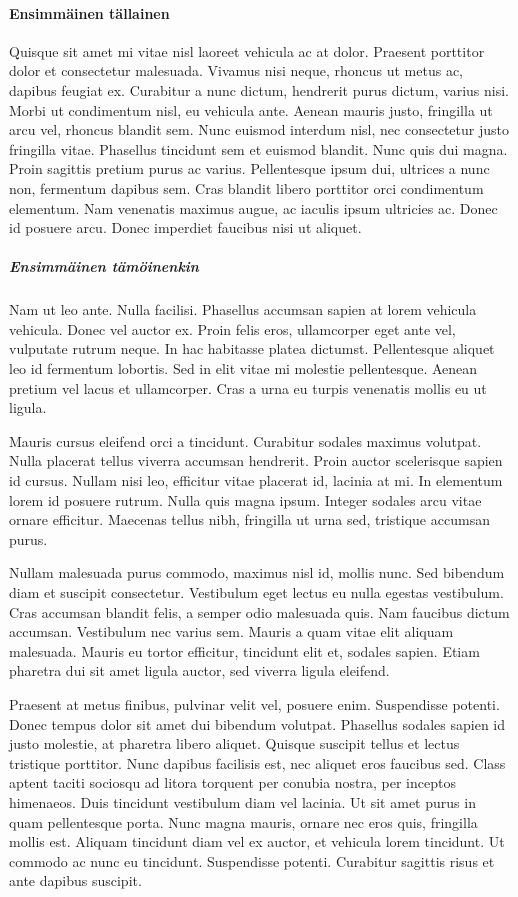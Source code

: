 \documentclass[12pt,a4paper,titlepage]{article}
\begin{document}
\paragraph{Ensimmäinen tällainen}
Quisque sit amet mi vitae nisl laoreet vehicula ac at dolor. Praesent porttitor dolor et consectetur malesuada. Vivamus nisi neque, rhoncus ut metus ac, dapibus feugiat ex. Curabitur a nunc dictum, hendrerit purus dictum, varius nisi. Morbi ut condimentum nisl, eu vehicula ante. Aenean mauris justo, fringilla ut arcu vel, rhoncus blandit sem. Nunc euismod interdum nisl, nec consectetur justo fringilla vitae. Phasellus tincidunt sem et euismod blandit. Nunc quis dui magna. Proin sagittis pretium purus ac varius. Pellentesque ipsum dui, ultrices a nunc non, fermentum dapibus sem. Cras blandit libero porttitor orci condimentum elementum. Nam venenatis maximus augue, ac iaculis ipsum ultricies ac. Donec id posuere arcu. Donec imperdiet faucibus nisi ut aliquet.

\subparagraph{Ensimmäinen tämöinenkin}
Nam ut leo ante. Nulla facilisi. Phasellus accumsan sapien at lorem vehicula vehicula. Donec vel auctor ex. Proin felis eros, ullamcorper eget ante vel, vulputate rutrum neque. In hac habitasse platea dictumst. Pellentesque aliquet leo id fermentum lobortis. Sed in elit vitae mi molestie pellentesque. Aenean pretium vel lacus et ullamcorper. Cras a urna eu turpis venenatis mollis eu ut ligula.

Mauris cursus eleifend orci a tincidunt. Curabitur sodales maximus volutpat. Nulla placerat tellus viverra accumsan hendrerit. Proin auctor scelerisque sapien id cursus. Nullam nisi leo, efficitur vitae placerat id, lacinia at mi. In elementum lorem id posuere rutrum. Nulla quis magna ipsum. Integer sodales arcu vitae ornare efficitur. Maecenas tellus nibh, fringilla ut urna sed, tristique accumsan purus.

Nullam malesuada purus commodo, maximus nisl id, mollis nunc. Sed bibendum diam et suscipit consectetur. Vestibulum eget lectus eu nulla egestas vestibulum. Cras accumsan blandit felis, a semper odio malesuada quis. Nam faucibus dictum accumsan. Vestibulum nec varius sem. Mauris a quam vitae elit aliquam malesuada. Mauris eu tortor efficitur, tincidunt elit et, sodales sapien. Etiam pharetra dui sit amet ligula auctor, sed viverra ligula eleifend.

Praesent at metus finibus, pulvinar velit vel, posuere enim. Suspendisse potenti. Donec tempus dolor sit amet dui bibendum volutpat. Phasellus sodales sapien id justo molestie, at pharetra libero aliquet. Quisque suscipit tellus et lectus tristique porttitor. Nunc dapibus facilisis est, nec aliquet eros faucibus sed. Class aptent taciti sociosqu ad litora torquent per conubia nostra, per inceptos himenaeos. Duis tincidunt vestibulum diam vel lacinia. Ut sit amet purus in quam pellentesque porta. Nunc magna mauris, ornare nec eros quis, fringilla mollis est. Aliquam tincidunt diam vel ex auctor, et vehicula lorem tincidunt. Ut commodo ac nunc eu tincidunt. Suspendisse potenti. Curabitur sagittis risus et ante dapibus suscipit.
\end{document}
